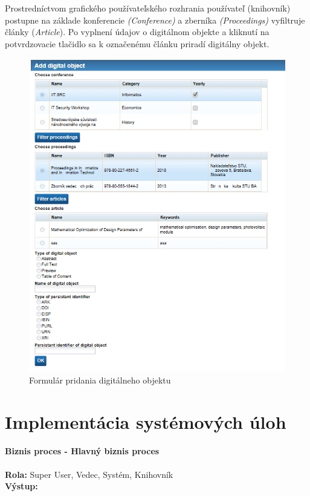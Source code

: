 \documentclass[10pt,oneside,slovak,a4paper]{article}
\begin{document}
Prostredníctvom grafického používateľského rozhrania používateľ (knihovník) postupne na základe konferencie \textit{(Conference)} a zberníka \textit{(Proceedings)} vyfiltruje články (\textit{Article}). Po vyplnení údajov o digitálnom objekte a kliknutí na potvrdzovacie tlačidlo sa k označenému článku priradí digitálny objekt.

\begin{figure} [H]
\centering
\includegraphics[scale=0.4]{forms/formAddDigital.png} 
\caption{Formulár pridania digitálneho objektu}
\end{figure}

\section{Implementácia systémových úloh}
\paragraph{Biznis proces - Hlavný biznis proces}
\textbf{Rola:} Super User, Vedec, Systém, Knihovník\\
\textbf{Výstup:}
\end{document}
